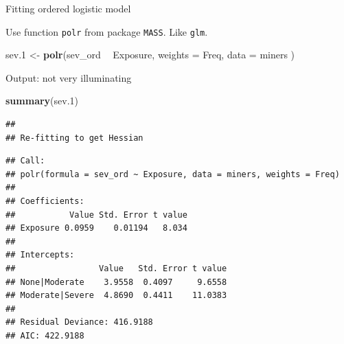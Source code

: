\documentclass[ignorenonframetext,]{beamer}
\newenvironment{Shaded}{\begin{snugshade}}{\end{snugshade}}
\newcommand{\DataTypeTok}[1]{\textcolor[rgb]{0.13,0.29,0.53}{#1}}
\newcommand{\FloatTok}[1]{\textcolor[rgb]{0.00,0.00,0.81}{#1}}
\newcommand{\KeywordTok}[1]{\textcolor[rgb]{0.13,0.29,0.53}{\textbf{#1}}}
\newcommand{\NormalTok}[1]{#1}
\newcommand{\OperatorTok}[1]{\textcolor[rgb]{0.81,0.36,0.00}{\textbf{#1}}}
\newcommand{\StringTok}[1]{\textcolor[rgb]{0.31,0.60,0.02}{#1}}
\begin{document}
\begin{frame}[fragile]{Fitting ordered logistic model}
\protect\hypertarget{fitting-ordered-logistic-model}{}

Use function \texttt{polr} from package \texttt{MASS}. Like
\texttt{glm}.

\begin{Shaded}
\begin{Highlighting}[]
\NormalTok{sev}\FloatTok{.1}\NormalTok{ <-}\StringTok{ }\KeywordTok{polr}\NormalTok{(sev_ord }\OperatorTok{~}\StringTok{ }\NormalTok{Exposure,}
  \DataTypeTok{weights =}\NormalTok{ Freq,}
  \DataTypeTok{data =}\NormalTok{ miners}
\NormalTok{)}
\end{Highlighting}
\end{Shaded}

\end{frame}

\begin{frame}[fragile]{Output: not very illuminating}
\protect\hypertarget{output-not-very-illuminating}{}

\scriptsize

\begin{Shaded}
\begin{Highlighting}[]
\KeywordTok{summary}\NormalTok{(sev}\FloatTok{.1}\NormalTok{)}
\end{Highlighting}
\end{Shaded}

\begin{verbatim}
## 
## Re-fitting to get Hessian
\end{verbatim}

\begin{verbatim}
## Call:
## polr(formula = sev_ord ~ Exposure, data = miners, weights = Freq)
## 
## Coefficients:
##           Value Std. Error t value
## Exposure 0.0959    0.01194   8.034
## 
## Intercepts:
##                 Value   Std. Error t value
## None|Moderate    3.9558  0.4097     9.6558
## Moderate|Severe  4.8690  0.4411    11.0383
## 
## Residual Deviance: 416.9188 
## AIC: 422.9188
\end{verbatim}

\normalsize

\end{frame}
\end{document}
